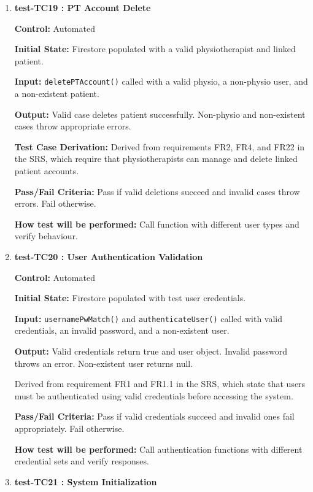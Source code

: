 \documentclass[12pt, titlepage]{article}
\begin{document}
\begin{enumerate}
  \item \textbf{test-TC19 : PT Account Delete}

  \textbf{Control:} Automated

  \textbf{Initial State:} Firestore populated with a valid physiotherapist and linked patient.

  \textbf{Input:} \texttt{deletePTAccount()} called with a valid physio, a non-physio user, and a non-existent patient.

  \textbf{Output:} Valid case deletes patient successfully. Non-physio and non-existent cases throw appropriate errors.

  \textbf{Test Case Derivation:} Derived from requirements FR2, FR4, and FR22 in the SRS, which require that physiotherapists can manage and delete linked patient accounts.

  \textbf{Pass/Fail Criteria:} Pass if valid deletions succeed and invalid cases throw errors. Fail otherwise.

  \textbf{How test will be performed:} Call function with different user types and verify behaviour.


  \vspace{0.5em}

  \item \textbf{test-TC20 : User Authentication Validation}

  \textbf{Control:} Automated

  \textbf{Initial State:} Firestore populated with test user credentials.

  \textbf{Input:} \texttt{usernamePwMatch()} and \texttt{authenticateUser()} called with valid credentials, an invalid password, and a non-existent user.

  \textbf{Output:} Valid credentials return true and user object. Invalid password throws an error. Non-existent user returns null.

  Derived from requirement FR1 and FR1.1 in the SRS, which state that users must be authenticated using valid credentials before accessing the system.

  \textbf{Pass/Fail Criteria:} Pass if valid credentials succeed and invalid ones fail appropriately. Fail otherwise.

  \textbf{How test will be performed:} Call authentication functions with different credential sets and verify responses.


  \vspace{0.5em}

  \item \textbf{test-TC21 : System Initialization}


\end{enumerate}
\end{document}

